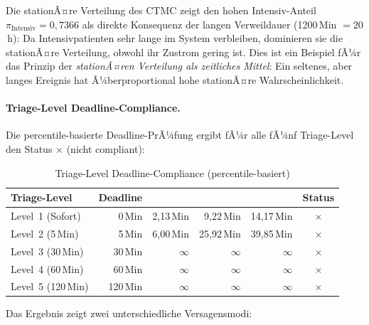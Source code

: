 ﻿\documentclass[a4paper,12pt]{report}
\theoremstyle{definition}
\begin{document}
Die stationÃ¤re Verteilung des CTMC zeigt den hohen Intensiv-Anteil
$\pi_\text{Intensiv} = 0{,}7366$ als direkte Konsequenz der langen
Verweildauer (1200\,Min $= 20$\,h): Da Intensivpatienten sehr lange
im System verbleiben, dominieren sie die stationÃ¤re Verteilung,
obwohl ihr Zustrom gering ist. Dies ist ein Beispiel fÃ¼r das Prinzip
der \emph{stationÃ¤ren Verteilung als zeitliches Mittel}: Ein seltenes,
aber langes Ereignis hat Ã¼berproportional hohe stationÃ¤re Wahrscheinlichkeit.

\paragraph{Triage-Level Deadline-Compliance.}
Die percentile-basierte Deadline-PrÃ¼fung ergibt fÃ¼r alle fÃ¼nf Triage-Level
den Status $\times$ (nicht compliant):

\begin{table}[H]
	\centering
	\begin{tabular}{@{}lrrrrc@{}}
		\toprule
		\textbf{Triage-Level} & \textbf{Deadline} & \boldmath{$t_{0{,}50}$} &
		\boldmath{$t_{0{,}95}$} & \boldmath{$t_{0{,}99}$} & \textbf{Status} \\
		\midrule
		Level~1 (Sofort)   & 0\,Min  &  2{,}13\,Min &  9{,}22\,Min & 14{,}17\,Min & $\times$ \\
		Level~2 (5\,Min)   & 5\,Min  &  6{,}00\,Min & 25{,}92\,Min & 39{,}85\,Min & $\times$ \\
		Level~3 (30\,Min)  & 30\,Min & $\infty$     & $\infty$     & $\infty$     & $\times$ \\
		Level~4 (60\,Min)  & 60\,Min & $\infty$     & $\infty$     & $\infty$     & $\times$ \\
		Level~5 (120\,Min) &120\,Min & $\infty$     & $\infty$     & $\infty$     & $\times$ \\
		\bottomrule
	\end{tabular}
	\caption{Triage-Level Deadline-Compliance (percentile-basiert)}
	\label{tab:triage-compliance}
\end{table}

Das Ergebnis zeigt zwei unterschiedliche Versagensmodi:
\end{document}
